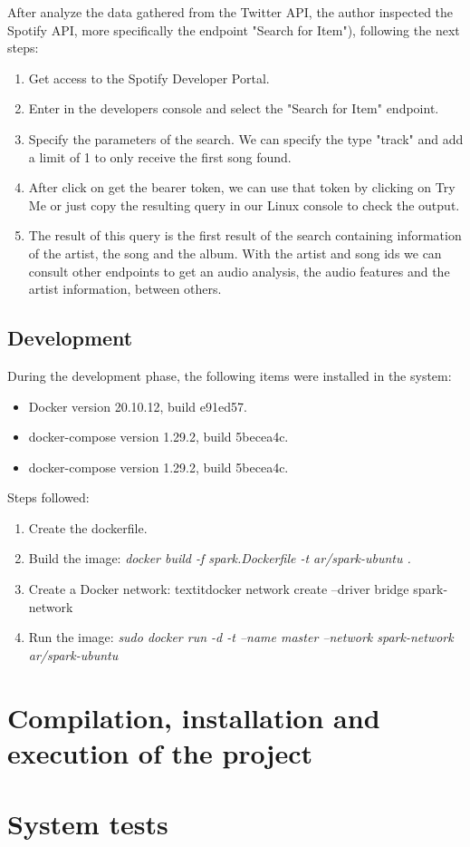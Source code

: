 \nonzeroparskip After analyze the data gathered from the Twitter API,  the author inspected the Spotify API, more specifically the endpoint "Search for Item"), following the next steps:
\begin{enumerate}
	\item Get access to the Spotify Developer Portal.
	\item Enter in the developers console and select the "Search for Item" endpoint.
	\item Specify the parameters of the search. We can specify the type "track" and add a limit of 1 to only receive the first song found.
	\item After click on get the bearer token, we can use that token by clicking on Try Me or just copy the resulting query in our Linux console to check the output.
	\item The result of this query is the first result of the search containing information of the artist, the song and the album. With the artist and song ids we can consult other endpoints to get an audio analysis, the audio features and the artist information, between others.
\end{enumerate}

\subsection{Development}
\nonzeroparskip During the development phase, the following items were installed in the system:
\begin{itemize}
	\item Docker version 20.10.12, build e91ed57.
	\item docker-compose version 1.29.2, build 5becea4c.
	\item docker-compose version 1.29.2, build 5becea4c.
\end{itemize}

\nonzeroparskip Steps followed:
\begin{enumerate}
	\item Create the dockerfile.
	\item Build the image:  \textit{docker build -f spark.Dockerfile -t ar/spark-ubuntu .}
	\item Create a Docker network: textit{docker network create --driver bridge spark-network}
	\item Run the image: \textit{sudo docker run -d -t --name master --network spark-network ar/spark-ubuntu}
\end{enumerate}

\section{Compilation, installation and execution of the project}


\section{System tests}

